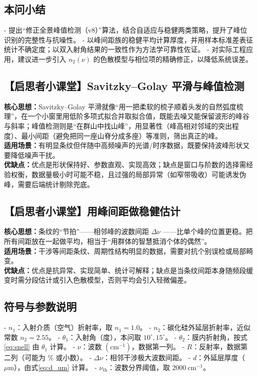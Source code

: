\documentclass{ctexart} %
\begin{document}
\subsection{本问小结}
- 提出“修正全景峰值检测（v8）”算法，结合自适应与稳健两类策略，提升了峰位识别的完整性与抗噪性。
- 以峰间距族的稳健平均计算厚度，并用样本标准差表征统计不确定度；以双入射角结果的一致性作为方法学可靠性佐证。
- 对实际工程应用，建议进一步引入 \(n_2(\nu)\) 的色散模型与相位项的精确修正，以降低系统误差。

\subsection*{【启思者小课堂】Savitzky–Golay 平滑与峰值检测}
\textbf{核心思想：}Savitzky–Golay 平滑就像“用一把柔软的梳子顺着头发的自然弧度梳理”，在一个小窗里用低阶多项式拟合并取拟合值，既能去噪又能保留波形的峰谷与斜率；峰值检测则是“在群山中找山峰”，用显著性（峰高相对邻域的突出程度）、最小间距（避免把同一座山脊分成多座）等准则，筛出真正的峰。
\\
\textbf{适用场景：}有明显条纹但伴随中高频噪声的光谱/时序数据，既要保持波峰形状又要降低噪声干扰。
\\
\textbf{优缺点：}优点是形状保持好、参数直观、实现高效；缺点是窗口与阶数的选择需经验权衡，数据量极小时可能不稳，且过强的局部异常（如窄带吸收）可能诱发伪峰，需要后端统计剔除兜底。

\subsection*{【启思者小课堂】用峰间距做稳健估计}
\textbf{核心思想：}条纹的“节拍”——相邻峰的波数间距 \(\Delta\nu\) ——比单个峰的位置更稳。把所有间距放在一起做平均，相当于“用群体的智慧抵消个体的偶然”。
\\
\textbf{适用场景：}干涉等间距条纹、周期性结构明显的数据，需要对抗个别误检或局部畸变。
\\
\textbf{优缺点：}优点是抗异常、实现简单、统计可解释；缺点是当条纹间距本身随频段缓变时需分段估计或引入色散模型，否则平均会引入轻微偏差。

\subsection*{符号与参数说明}
- \(n_1\)：入射介质（空气）折射率，取 \(n_1=1.0\)。
- \(n_2\)：碳化硅外延层折射率，近似常数 \(n_2=2.55\)。
- \(\theta_1\)：入射角（度），本问取 \(10^\circ,15^\circ\)。
- \(\theta_2\)：膜内折射角，按式\eqref{eq:snell} 由 \(\theta_1\) 计算。
- \(\nu\)：波数 \((\mathrm{cm}^{-1})\)，数据第一列。
- \(R\)：反射率，数据第二列（可能为 \% 或小数）。
- \(\Delta\nu\)：相邻干涉极大波数间距。
- \(d\)：外延层厚度（\(\mu\mathrm{m}\)），由式\eqref{eq:d_um} 计算。
- \(\nu_{\mathrm{th}}\)：波数分界阈值，取 \(2000~\mathrm{cm}^{-1}\)。
\end{document}
